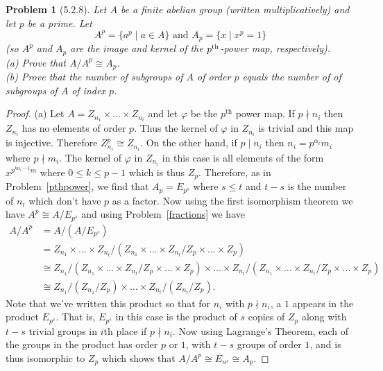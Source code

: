 \documentclass{article}
\newtheorem{problem}{Problem}
\begin{document}
\begin{problem}[5.2.8]
Let $A$ be a finite abelian group (written multiplicatively) and let $p$ be a prime. Let
\[
\text{$A^p = \{a^p \mid a \in A\}$ and $A_p = \{x \mid x^p = 1\}$}
\]
(so $A^p$ and $A_p$ are the image and kernel of the $p^{\textup{th}}$-power map, respectively).\\
(a) Prove that $A/A^p \cong A_p$.\\
(b) Prove that the number of subgroups of $A$ of order $p$ equals the number of of subgroups of $A$ of index $p$.
\end{problem}
\begin{proof}
(a) Let $A = Z_{n_1} \times \dots \times Z_{n_t}$ and let $\varphi$ be the $p^{\text{th}}$ power map. If $p \nmid n_i$ then $Z_{n_i}$ has no elements of order $p$. Thus the kernel of $\varphi$ in $Z_{n_i}$ is trivial and this map is injective. Therefore $Z_{n_i}^p \cong Z_{n_i}$. On the other hand, if $p \mid n_i$ then $n_i = p^{\alpha_i}m_i$ where $p \nmid m_i$. The kernel of $\varphi$ in $Z_{n_i}$ in this case is all elements of the form $x^{p^{k\alpha_i-1}m}$ where $0 \leq k \leq p-1$ which is thus $Z_p$. Therefore, as in Problem~\ref{pthpower}, we find that $A_p = E_{p^s}$ where $s \leq t$ and $t-s$ is the number of $n_i$ which don't have $p$ as a factor. Now using the first isomorphism theorem we have $A^p \cong A/E_{p^s}$ and using Problem~\ref{fractions} we have
\begin{align*}
A/A^p
&= A/(A/E_{p^s})\\
&= Z_{n_1} \times \dots \times Z_{n_t}/(Z_{n_1} \times \dots \times Z_{n_t}/Z_p \times \dots \times Z_p)\\
&\cong Z_{n_1}/(Z_{n_1} \times \dots \times Z_{n_t}/Z_p \times \dots \times Z_p) \times \dots \times Z_{n_t}/(Z_{n_1} \times \dots \times Z_{n_t}/Z_p \times \dots \times Z_p)\\
&\cong Z_{n_1}/(Z_{n_1}/Z_p) \times \dots \times Z_{n_t}/(Z_{n_t}/Z_p).
\end{align*}
Note that we've written this product so that for $n_i$ with $p \nmid n_i$, a $1$ appears in the product $E_{p^s}$. That is, $E_{p^s}$ in this case is the product of $s$ copies of $Z_p$ along with $t-s$ trivial groups in $i$th place if $p \nmid n_i$. Now using Lagrange's Theorem, each of the groups in the product has order $p$ or $1$, with $t-s$ groups of order $1$, and is thus isomorphic to $Z_p$ which shows that $A/A^p \cong E_{n^s} \cong A_p$.


\end{proof}
\end{document}
